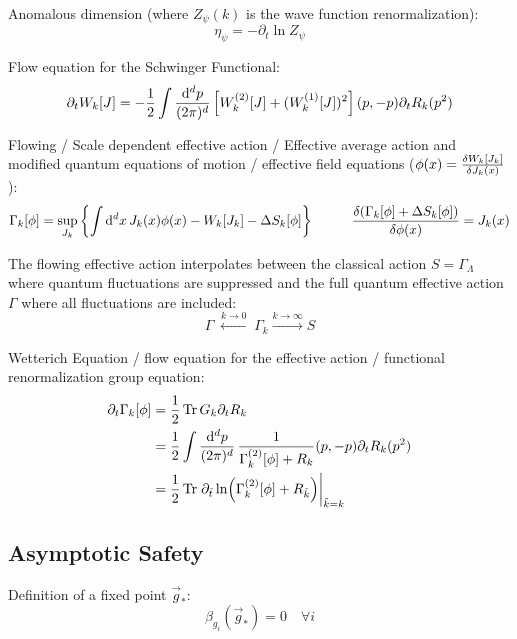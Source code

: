 		\noindent
		Anomalous dimension (where $Z_\psi(k)$ is the wave function renormalization):
		\begin{equation}
			\eta_\psi = -\partial_t \ln Z_\psi
		\end{equation}

		\noindent
		Flow equation for the Schwinger Functional:
		\begin{equation}
			\partial_t W_k[J] = -\frac{1}{2}\int \frac{\dd^d p}{(2\pi)^d} \, \qty[W^{(2)}_k[J]+(W_k^{(1)}[J])^2](p,-p) \partial_t R_k(p^2)
		\end{equation}

		\noindent
		Flowing / Scale dependent effective action / Effective average action and modified quantum equations of motion / effective field equations ($\phi(x)= \fdv{W_k[J_k]}{J_k(x)}$):
		\begin{equation}
			\Gamma_k[\phi] = \sup_{J_k} \qty{\int \dd^d x\, J_k(x) \phi(x) - W_k[J_k] - \Delta S_k[\phi]}
			\hsp \fdv{(\Gamma_k[\phi] + \Delta S_k[\phi])}{\phi(x)} = J_k(x)
		\end{equation}

		\noindent
		The flowing effective action interpolates between the classical action $S = \Gamma_\Lambda$ where quantum fluctuations are suppressed and the full quantum effective action $\Gamma$ where all fluctuations are included:
		\begin{equation}
			\Gamma \;\stackrel{k \to 0}{\longleftarrow}\; \Gamma_{k} \stackrel{k \to \infty}{\longrightarrow} S
		\end{equation}

		\noindent
		Wetterich Equation / flow equation for the effective action / functional renormalization group equation:
		\begin{equation}
			\begin{aligned}
				\partial_t \Gamma_k[\phi] 
				&= \frac{1}{2} \tr G_k \partial_t R_k \\
				&= \frac{1}{2} \int \frac{\dd^d p}{(2\pi)^d} \, \frac{1}{\Gamma^{(2)}_k[\phi] + R_k}(p,-p) \partial_t R_k(p^2) \\
				&= \frac{1}{2} \tr \eval{\partial_{\tilde{t}} \ln(\Gamma^{(2)}_k[\phi] + R_{\tilde{k}})}_{\tilde{k} = k}
			\end{aligned}
		\end{equation}

	\subsection{Asymptotic Safety}
		\noindent
		Definition of a fixed point $\vec{g}_{*}$:
		\begin{equation}
			\beta_{g_i}(\vec{g}_{*}) = 0 \quad \forall i
		\end{equation}

